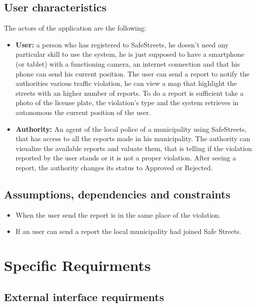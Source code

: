 \documentclass[12pt,a4paper]{report}
\begin{document}
	\section{User characteristics}
		The actors of the application are the following:
		\begin{itemize}
			\item \textbf{User:}
				a person who has registered to SafeStreets, he doesn't need any particular skill to use the system, 
				he is just supposed to have a smartphone (or tablet) with a functioning camera, an internet connection and
				that his phone can send his current position. The user can send a report to notify the authorities various traffic
				violation, he can view a map that highlight the streets with an higher number of reports. To do a report is sufficient
				take a photo of the license plate, the violation's type and the system retrieves in autonomous the current position
				of the user.
			\item \textbf{Authority:}
				An agent of the local police of a municipality using SafeStreets, that has access to all the reports made in his municipality. The authority can visualize the available reports and valuate them, that is telling if the violation reported by the user stands or it is not a proper violation. After seeing a report, the authority changes its status to Approved or Rejected.
		\end{itemize}
	\section{Assumptions, dependencies and constraints}
		\begin{itemize}
			\item When the user send the report is in the same place of the violation.
			\item If an user can send a report the local municipality had joined Safe Streets.
		\end{itemize}

\chapter{Specific Requirments}
	\section{External interface requirments}
\end{document}
